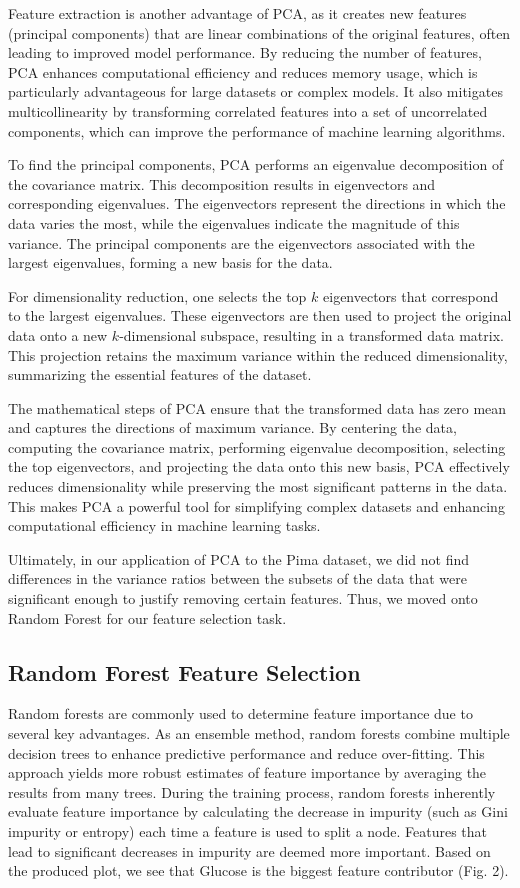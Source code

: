 \documentclass[journal]{IEEEtran}
\begin{document}
Feature extraction is another advantage of PCA, as it creates new features (principal components) that are linear combinations of the original features, often leading to improved model performance. By reducing the number of features, PCA enhances computational efficiency and reduces memory usage, which is particularly advantageous for large datasets or complex models. It also mitigates multicollinearity by transforming correlated features into a set of uncorrelated components, which can improve the performance of machine learning algorithms.

To find the principal components, PCA performs an eigenvalue decomposition of the covariance matrix. This decomposition results in eigenvectors and corresponding eigenvalues. The eigenvectors represent the directions in which the data varies the most, while the eigenvalues indicate the magnitude of this variance. The principal components are the eigenvectors associated with the largest eigenvalues, forming a new basis for the data.

For dimensionality reduction, one selects the top $k$ eigenvectors that correspond to the largest eigenvalues. These eigenvectors are then used to project the original data onto a new $k$-dimensional subspace, resulting in a transformed data matrix. This projection retains the maximum variance within the reduced dimensionality, summarizing the essential features of the dataset.

The mathematical steps of PCA ensure that the transformed data has zero mean and captures the directions of maximum variance. By centering the data, computing the covariance matrix, performing eigenvalue decomposition, selecting the top eigenvectors, and projecting the data onto this new basis, PCA effectively reduces dimensionality while preserving the most significant patterns in the data. This makes PCA a powerful tool for simplifying complex datasets and enhancing computational efficiency in machine learning tasks.

Ultimately, in our application of PCA to the Pima dataset, we did not find differences in the variance ratios between the subsets of the data that were significant enough to justify removing certain features. Thus, we moved onto Random Forest for our feature selection task.

\subsection{Random Forest Feature Selection}
Random forests are commonly used to determine feature importance due to several key advantages. As an ensemble method, random forests combine multiple decision trees to enhance predictive performance and reduce over-fitting. This approach yields more robust estimates of feature importance by averaging the results from many trees. During the training process, random forests inherently evaluate feature importance by calculating the decrease in impurity (such as Gini impurity or entropy) each time a feature is used to split a node. Features that lead to significant decreases in impurity are deemed more important. Based on the produced plot, we see that Glucose is the biggest feature contributor (Fig. 2).
\end{document}
